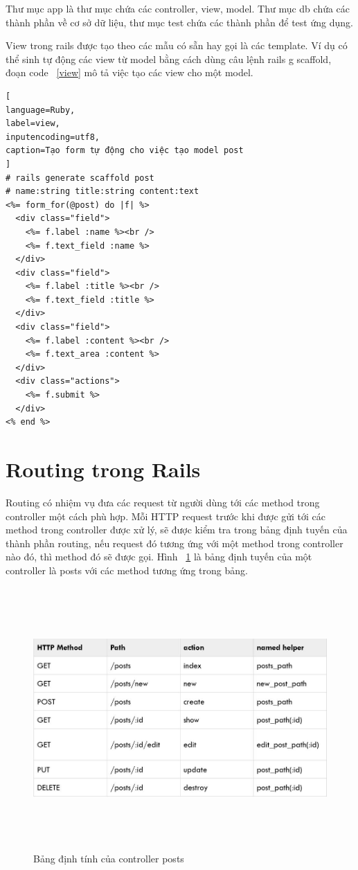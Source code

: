 Thư mục app là thư mục chứa các controller, view, model. Thư mục db chứa các thành phần về cơ sở dữ liệu, thư mục test chứa các thành phần để test ứng dụng.

View trong rails được tạo theo các mẫu có sẵn hay gọi là các template. Ví dụ có thể sinh tự động các view từ model bằng cách dùng câu lệnh rails g scaffold, đoạn code ~\ref{view} mô tả việc tạo các view cho một model.
 
\begin{lstlisting}[
language=Ruby,
label=view,
inputencoding=utf8,
caption=Tạo form tự động cho việc tạo model post
]
# rails generate scaffold post 
# name:string title:string content:text
<%= form_for(@post) do |f| %>
  <div class="field">
    <%= f.label :name %><br />
    <%= f.text_field :name %>
  </div>
  <div class="field">
    <%= f.label :title %><br />
    <%= f.text_field :title %>
  </div>
  <div class="field">
    <%= f.label :content %><br />
    <%= f.text_area :content %>
  </div>
  <div class="actions">
    <%= f.submit %>
  </div>
<% end %>

\end{lstlisting}

\section{Routing trong Rails}
Routing có nhiệm vụ đưa các request từ người dùng tới các method trong controller một cách phù hợp.
Mỗi HTTP request trước khi được gửi tới các method trong controller được xử lý, sẽ được kiểm tra trong bảng định tuyến của thành phần routing, nếu request đó tương ứng với một method trong controller nào đó, thì method đó sẽ được gọi. Hình ~\ref{fig:routing} là bảng định tuyến của một controller là posts với các method tương ứng trong bảng.
\begin{figure}
	\centering
		\includegraphics[width=14cm, height=10cm]{image/routing.JPG}
	\caption{Bảng định tính của controller posts}
	\label{fig:routing}
\end{figure}

